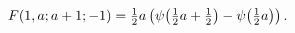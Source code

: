 \[\mathop{F\/}\nolimits\!\left(1,a;a+1;-1\right)=\tfrac{1}{2}a\left(\mathop{\psi%
\/}\nolimits\!\left(\tfrac{1}{2}a+\tfrac{1}{2}\right)-\mathop{\psi\/}\nolimits%
\!\left(\tfrac{1}{2}a\right)\right).\]